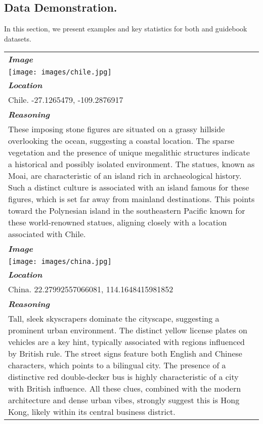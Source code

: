 \subsection{Data Demonstration.}

In this section, we present examples and key statistics for both \dataname and guidebook datasets.


\begin{table*}[htbp]
\centering
\small
    \begin{tabularx}{\linewidth}{Y}
    \toprule 
        \textit{\textbf{Image}} \\
        \texttt{[image: images/chile.jpg]} \\
        \midrule
        \textit{\textbf{Location}} \\
        Chile. -27.1265479, -109.2876917 \\
        \midrule
        \textit{\textbf{Reasoning}} \\
        These imposing stone figures are situated on a grassy hillside overlooking the ocean, suggesting a coastal location. The sparse vegetation and the presence of unique megalithic structures indicate a historical and possibly isolated environment. The statues, known as Moai, are characteristic of an island rich in archaeological history. Such a distinct culture is associated with an island famous for these figures, which is set far away from mainland destinations. This points toward the Polynesian island in the southeastern Pacific known for these world-renowned statues, aligning closely with a location associated with Chile. \\
    \toprule 
        \textit{\textbf{Image}} \\
        \texttt{[image: images/china.jpg]} \\
        \midrule
        \textit{\textbf{Location}} \\
        China. 22.27992557066081, 114.1648415981852 \\
        \midrule
        \textit{\textbf{Reasoning}} \\
        Tall, sleek skyscrapers dominate the cityscape, suggesting a prominent urban environment. The distinct yellow license plates on vehicles are a key hint, typically associated with regions influenced by British rule. The street signs feature both English and Chinese characters, which points to a bilingual city. The presence of a distinctive red double-decker bus is highly characteristic of a city with British influence. All these clues, combined with the modern architecture and dense urban vibes, strongly suggest this is Hong Kong, likely within its central business district. \\

\end{tabularx}
\end{table*}
